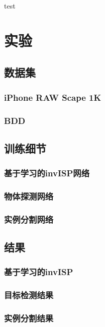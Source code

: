 \documentclass[winfonts]{njuthesis}
\begin{document}
test


\chapter{实验}



\section{数据集}

\subsection{iPhone RAW Scape 1K}

\subsection{BDD}

\section{训练细节}

\subsection{基于学习的invISP网络}

\subsection{物体探测网络}

\subsection{实例分割网络}

\section{结果}

\subsection{基于学习的invISP}

\subsection{目标检测结果}

\subsection{实例分割结果}
\end{document}

